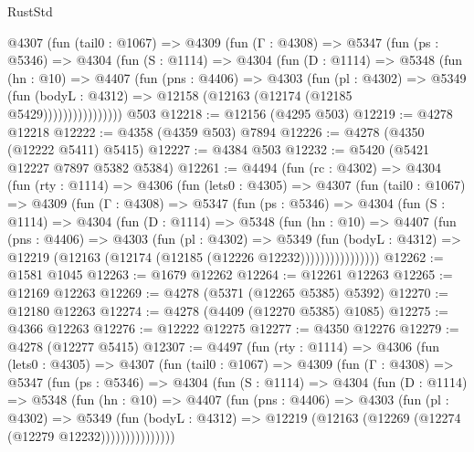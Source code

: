 \begin{lexlean}{RustStd}
\begin{coremodule}
{\begin{coremodule}
{{{{{{{{{{{{{{{{{{{{{{{{{{{{{{{{{{{          @4307
            (fun (tail0 : @1067) =>
            @4309
              (fun (Γ : @4308) =>
              @5347
                (fun (ps : @5346) =>
                @4304
                  (fun (S : @1114) =>
                  @4304
                    (fun (D : @1114) =>
                    @5348
                      (fun (hn : @10) =>
                      @4407
                        (fun (pns : @4406) =>
                        @4303
                          (fun (pl : @4302) =>
                          @5349
                            (fun (bodyL : @4312) =>
                            @12158 (@12163 (@12174 (@12185 @5429))))))))))))))))
    @503
@12218 := @12156 (@4295 @503)
@12219 := @4278 @12218
@12222 := @4358 (@4359 @503) @7894
@12226 := @4278 (@4350 (@12222 @5411) @5415)
@12227 := @4384 @503
@12232 := @5420 (@5421 @12227 @7897 @5382 @5384)
@12261 := @4494
    (fun (rc : @4302) =>
    @4304
      (fun (rty : @1114) =>
      @4306
        (fun (lets0 : @4305) =>
        @4307
          (fun (tail0 : @1067) =>
          @4309
            (fun (Γ : @4308) =>
            @5347
              (fun (ps : @5346) =>
              @4304
                (fun (S : @1114) =>
                @4304
                  (fun (D : @1114) =>
                  @5348
                    (fun (hn : @10) =>
                    @4407
                      (fun (pns : @4406) =>
                      @4303
                        (fun (pl : @4302) =>
                        @5349
                          (fun (bodyL : @4312) =>
                          @12219 (@12163 (@12174 (@12185 (@12226 @12232))))))))))))))))
@12262 := @1581 @1045
@12263 := @1679 @12262
@12264 := @12261 @12263
@12265 := @12169 @12263
@12269 := @4278 (@5371 (@12265 @5385) @5392)
@12270 := @12180 @12263
@12274 := @4278 (@4409 (@12270 @5385) @1085)
@12275 := @4366 @12263
@12276 := @12222 @12275
@12277 := @4350 @12276
@12279 := @4278 (@12277 @5415)
@12307 := @4497
    (fun (rty : @1114) =>
    @4306
      (fun (lets0 : @4305) =>
      @4307
        (fun (tail0 : @1067) =>
        @4309
          (fun (Γ : @4308) =>
          @5347
            (fun (ps : @5346) =>
            @4304
              (fun (S : @1114) =>
              @4304
                (fun (D : @1114) =>
                @5348
                  (fun (hn : @10) =>
                  @4407
                    (fun (pns : @4406) =>
                    @4303
                      (fun (pl : @4302) =>
                      @5349
                        (fun (bodyL : @4312) =>
                        @12219 (@12163 (@12269 (@12274 (@12279 @12232)))))))))))))))
}}}}}}}}}}}}}}}}}}}}}}}}}}}}}}}}}}}
\end{coremodule}}
\end{coremodule}
\end{lexlean}
